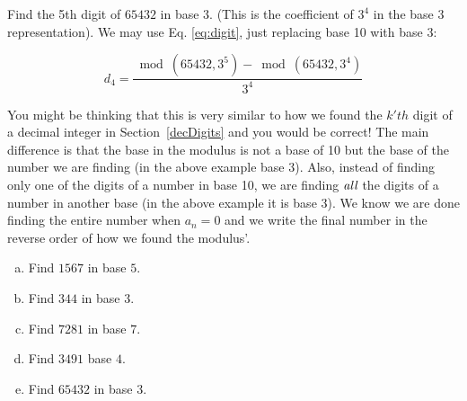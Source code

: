 \begin{example}\label{example:bases:65432 in base 3}
Find the 5th digit of $65432$ in base $3$. (This is the coefficient of $3^4$ in the base 3 representation). We may use 
Eq. \ref{eq:digit}, just replacing base 10 with base 3:

\begin{equation*}
d_{4}=\frac{\bmod(65432,3^{5})-\bmod(65432,3^{4})}{3^{4}}
\end{equation*}
\end{example}

You might be thinking that this is very similar to how we found the $k'th$ digit of a decimal integer in Section~\ref{decDigits} and you would be correct! The main difference  is that the base in the modulus is not a base of 10 but the base of the number we are finding (in the above example base 3). Also, instead of finding only one of the digits of a number in base 10, we are finding $\emph{all}$ the digits of a number in another base (in the above example it is base 3). We know we are done finding the entire number when $a_{n}=0$ and we write the final number in the reverse order of how we found the modulus'.

\begin{exercise}\label{exercise:bases:numbers in other bases}
\begin{enumerate}[(a)]
\item Find $1567$ in base $5$.
\item Find $344$ in base $3$.
\item Find $7281$ in base $7$.
\item Find $3491$ base $4$.
\item Find $65432$ in base $3$.
\end{enumerate}
\end{exercise}

